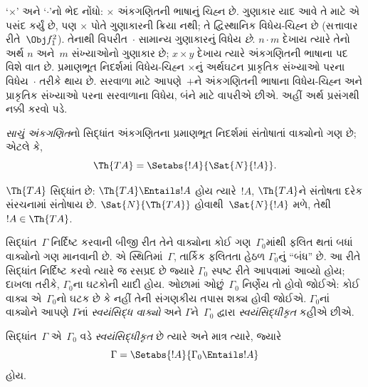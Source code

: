 `$\times$' અને `$\cdot$'નો ભેદ નોંધો: $\times$
અંકગણિતની ભાષાનું ચિહ્ન છે. ગુણાકાર યાદ આવે
તે માટે એ પસંદ કર્યું છે, પણ $\times$ પોતે
ગુણાકારની ક્રિયા નથી; તે દ્વિસ્થાનિક વિધેય-ચિહ્ન
છે (સત્તાવાર રીતે~$\Obj f^2_1$). તેનાથી
વિપરીત~$\cdot$ સામાન્ય ગુણાકારનું વિધેય
\emph{છે}. $n \cdot m$ દેખાય ત્યારે તેનો
અર્થ $n$ અને~$m$ સંખ્યાઓનો ગુણાકાર છે;
$x \times y$ દેખાય ત્યારે અંકગણિતની ભાષાના
પદ વિશે વાત છે. પ્રમાણભૂત નિદર્શમાં વિધેય-ચિહ્ન
$\times$નું અર્થઘટન પ્રાકૃતિક સંખ્યાઓ પરના
વિધેય~$\cdot$ તરીકે થાય છે. સરવાળા માટે
આપણે~$+$ને અંકગણિતની ભાષાના વિધેય-ચિહ્ન
અને પ્રાકૃતિક સંખ્યાઓ પરના સરવાળાના વિધેય,
બંને માટે વાપરીએ છીએ. અહીં અર્થ પ્રસંગથી
નક્કી કરવો પડે.

\begin{defn}
\emph{સાચું અંકગણિત}નો સિદ્ધાંત અંકગણિતના
પ્રમાણભૂત નિદર્શમાં સંતોષાતાં વાક્યોનો ગણ છે;
એટલે કે,
\[
\Th{TA} = \Setabs{!A}{\Sat{N}{!A}}.
\]
\end{defn}

$\Th{TA}$ સિદ્ધાંત છે: $\Th{TA} \Entails !A$
હોય ત્યારે~$!A$, $\Th{TA}$ને સંતોષતા દરેક
સંરચનામાં સંતોષાય છે. $\Sat{N}{\Th{TA}}$
હોવાથી~$\Sat{N}{!A}$ મળે, તેથી
$!A \in \Th{TA}$.

સિદ્ધાંત~$\Gamma$ નિર્દિષ્ટ કરવાની બીજી રીત
તેને વાક્યોના કોઈ ગણ~$\Gamma_0$માંથી ફલિત
થતાં બધાં વાક્યોનો ગણ માનવાની છે.
એ સ્થિતિમાં~$\Gamma$, તાર્કિક ફલિતતા હેઠળ
$\Gamma_0$નું ``બંધ'' છે. આ રીતે સિદ્ધાંત
નિર્દિષ્ટ કરવો ત્યારે જ રસપ્રદ છે જ્યારે
$\Gamma_0$ સ્પષ્ટ રીતે આપવામાં આવ્યો હોય;
દાખલા તરીકે, $\Gamma_0$ના ઘટકોની યાદી હોય.
ઓછામાં ઓછું~$\Gamma_0$ નિર્ણેય તો હોવો
જોઈએ: કોઈ વાક્ય એ~$\Gamma_0$નો
ઘટક છે કે નહીં તેની સંગણકીય તપાસ શક્ય હોવી
જોઈએ. $\Gamma_0$નાં વાક્યોને આપણે
$\Gamma$નાં \emph{સ્વયંસિદ્ધ વાક્યો} અને
$\Gamma$ને~$\Gamma_0$ દ્વારા
\emph{સ્વયંસિદ્ધીકૃત} કહીએ છીએ.

\begin{defn}
સિદ્ધાંત~$\Gamma$ એ~$\Gamma_0$ વડે
\emph{સ્વયંસિદ્ધીકૃત} છે ત્યારે અને માત્ર ત્યારે,
જ્યારે
\[
\Gamma = \Setabs{!A}{\Gamma_0 \Entails !A}
\]
હોય.
\end{defn}

